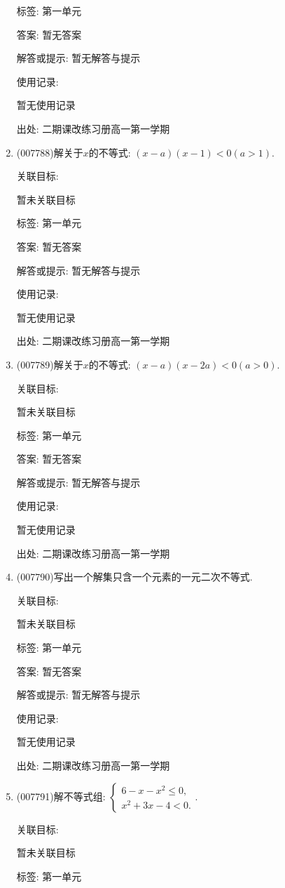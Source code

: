 \documentclass[10pt,a4paper]{article}
\begin{document}
\begin{enumerate}[1.]
标签: 第一单元

答案: 暂无答案

解答或提示: 暂无解答与提示

使用记录:

暂无使用记录


出处: 二期课改练习册高一第一学期
\item { (007788)}解关于$x$的不等式: $(x-a)(x-1)<0(a>1)$.


关联目标:

暂未关联目标



标签: 第一单元

答案: 暂无答案

解答或提示: 暂无解答与提示

使用记录:

暂无使用记录


出处: 二期课改练习册高一第一学期
\item { (007789)}解关于$x$的不等式: $(x-a)(x-2a)<0(a>0)$.


关联目标:

暂未关联目标



标签: 第一单元

答案: 暂无答案

解答或提示: 暂无解答与提示

使用记录:

暂无使用记录


出处: 二期课改练习册高一第一学期
\item { (007790)}写出一个解集只含一个元素的一元二次不等式.


关联目标:

暂未关联目标



标签: 第一单元

答案: 暂无答案

解答或提示: 暂无解答与提示

使用记录:

暂无使用记录


出处: 二期课改练习册高一第一学期
\item { (007791)}解不等式组: $\begin{cases} 6-x-x^2\le 0, \\ x^2+3x-4<0. \end{cases}$.


关联目标:

暂未关联目标



标签: 第一单元


\end{enumerate}
\end{document}
